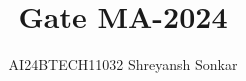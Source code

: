 \documentclass[journal]{IEEEtran}
\begin{document}

\vspace{3cm}

\title{Gate MA-2024}
\author{AI24BTECH11032 Shreyansh Sonkar}
{\let\newpage\relax\maketitle}

\renewcommand{\thefigure}{\theenumi}
\renewcommand{\thetable}{\theenumi}
\setlength{\intextsep}{10pt} %


\renewcommand{\thetable}{\theenumi}
\end{document}
